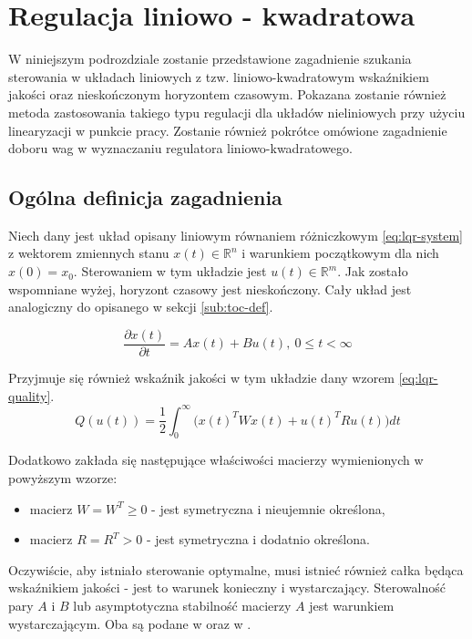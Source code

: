 \section{Regulacja liniowo - kwadratowa}
\label{sec:lqr}

W niniejszym podrozdziale zostanie przedstawione zagadnienie szukania sterowania w układach liniowych z tzw. liniowo-kwadratowym wskaźnikiem jakości oraz nieskończonym horyzontem czasowym. Pokazana zostanie również metoda zastosowania takiego typu regulacji dla układów nieliniowych przy użyciu linearyzacji w punkcie pracy. Zostanie również pokrótce omówione zagadnienie doboru wag w wyznaczaniu regulatora liniowo-kwadratowego.

\subsection{Ogólna definicja zagadnienia}
\label{sub:lqr-def}

Niech dany jest układ opisany liniowym równaniem różniczkowym \ref{eq:lqr-system} z wektorem zmiennych stanu $x(t) \in \mathbb{R}^{n}$ i warunkiem początkowym dla nich $x(0) = x_{0}$. Sterowaniem w tym układzie jest $u(t) \in \mathbb{R}^{m}$. Jak zostało wspomniane wyżej, horyzont czasowy jest nieskończony. Cały układ jest analogiczny do opisanego w sekcji \ref{sub:toc-def}.

\begin{equation}\label{eq:lqr-system}
\frac{\partial x(t)}{\partial t} = Ax(t) + Bu(t),~ 0 \leq t < \infty
\end{equation}

Przyjmuje się również wskaźnik jakości w tym układzie dany wzorem \ref{eq:lqr-quality}.
\begin{equation}\label{eq:lqr-quality}
Q(u(t)) = \frac{1}{2}\int_{0}^{\infty} \Big(x(t)^{T}Wx(t) + u(t)^{T}Ru(t)\Big)dt
\end{equation}

Dodatkowo zakłada się następujące właściwości macierzy wymienionych w powyższym wzorze:
\begin{itemize}
    \item macierz $W = W^{T} \geq 0$ - jest symetryczna i nieujemnie określona,
    \item macierz $R = R^{T} > 0$ - jest symetryczna i dodatnio określona.
\end{itemize}

Oczywiście, aby istniało sterowanie optymalne, musi istnieć również całka będąca wskaźnikiem jakości - jest to warunek konieczny i wystarczający. Sterowalność pary $A$ i $B$ lub asymptotyczna stabilność macierzy $A$ jest warunkiem wystarczającym. Oba są podane w \cite{Korytowski2015} oraz w \cite{AthansOptCtrl}.

